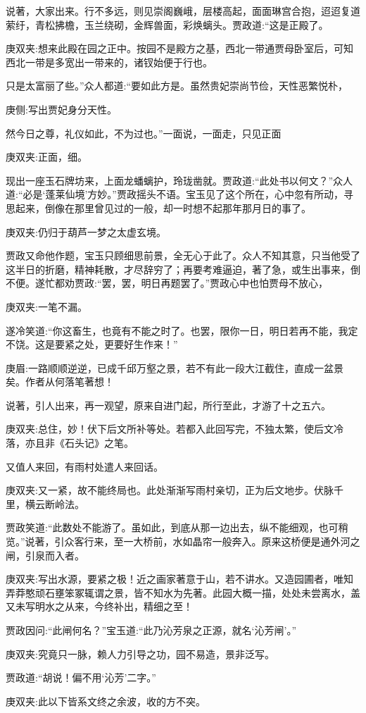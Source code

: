 \begin{parag}
    说著，大家出来。行不多远，则见崇阁巍峨，层楼高起，面面琳宫合抱，迢迢复道萦纡，青松拂檐，玉兰绕砌，金辉兽面，彩焕螭头。贾政道:“这是正殿了。\begin{note}庚双夹:想来此殿在园之正中。按园不是殿方之基，西北一带通贾母卧室后，可知西北一带是多宽出一带来的，诸钗始便于行也。\end{note}只是太富丽了些。”众人都道:“要如此方是。虽然贵妃崇尚节俭，天性恶繁悦朴，\begin{note}庚侧:写出贾妃身分天性。\end{note}然今日之尊，礼仪如此，不为过也。”一面说，一面走，只见正面\begin{note}庚双夹:正面，细。\end{note}现出一座玉石牌坊来，上面龙蟠螭护，玲珑凿就。贾政道:“此处书以何文？”众人道:“必是‘蓬莱仙境’方妙。”贾政摇头不语。宝玉见了这个所在，心中忽有所动，寻思起来，倒像在那里曾见过的一般，却一时想不起那年那月日的事了。\begin{note}庚双夹:仍归于葫芦一梦之太虚玄境。\end{note}贾政又命他作题，宝玉只顾细思前景，全无心于此了。众人不知其意，只当他受了这半日的折磨，精神耗散，才尽辞穷了；再要考难逼迫，著了急，或生出事来，倒不便。遂忙都劝贾政:“罢，罢，明日再题罢了。”贾政心中也怕贾母不放心，\begin{note}庚双夹:一笔不漏。\end{note}遂冷笑道:“你这畜生，也竟有不能之时了。也罢，限你一日，明日若再不能，我定不饶。这是要紧之处，更要好生作来！”\begin{note}庚眉:一路顺顺逆逆，已成千邱万壑之景，若不有此一段大江截住，直成一盆景矣。作者从何落笔著想！\end{note}
\end{parag}


\begin{parag}
    说著，引人出来，再一观望，原来自进门起，所行至此，才游了十之五六。\begin{note}庚双夹:总住，妙！伏下后文所补等处。若都入此回写完，不独太繁，使后文冷落，亦且非《石头记》之笔。\end{note}又值人来回，有雨村处遣人来回话。\begin{note}庚双夹:又一紧，故不能终局也。此处渐渐写雨村亲切，正为后文地步。伏脉千里，横云断岭法。\end{note}贾政笑道:“此数处不能游了。虽如此，到底从那一边出去，纵不能细观，也可稍览。”说著，引众客行来，至一大桥前，水如晶帘一般奔入。原来这桥便是通外河之闸，引泉而入者。\begin{note}庚双夹:写出水源，要紧之极！近之画家著意于山，若不讲水。又造园圃者，唯知弄莽憨顽石壅笨冢辄谓之景，皆不知水为先著。此园大概一描，处处未尝离水，盖又未写明水之从来，今终补出，精细之至！\end{note}贾政因问:“此闸何名？”宝玉道:“此乃沁芳泉之正源，就名‘沁芳闸’。”\begin{note}庚双夹:究竟只一脉，赖人力引导之功，园不易造，景非泛写。\end{note}贾政道:“胡说！偏不用‘沁芳’二字。”\begin{note}庚双夹:此以下皆系文终之余波，收的方不突。\end{note}
\end{parag}


